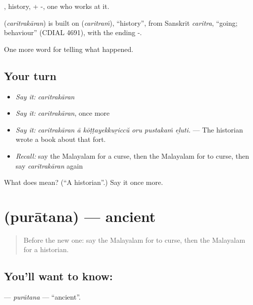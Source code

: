 , history, + -, one who works at it.

\begin{cousinweb}
\textbf{} (\emph{caritrakāran}) is built on  (\emph{caritraṁ}), \textquotedblleft{}history\textquotedblright{}, from Sanskrit \emph{caritra}, \textquotedblleft{}going; behaviour\textquotedblright{} (CDIAL 4691), with the ending -.
\end{cousinweb}

\begin{grammarlens}[title={What you've built}]
One more word for telling what happened.
\end{grammarlens}

\subsection*{Your turn}
\begin{itemize}
\raggedright
  \item \emph{Say it:} \emph{caritrakāran}
  \item \emph{Say it:} \emph{caritrakāran}, once more
  \item \emph{Say it:} \emph{caritrakāran ā kōṭṭayekkuṟiccŭ oru pustakaṁ eḻuti.} — The historian wrote a book about that fort.
  \item \emph{Recall:} say the Malayalam for a curse, then the Malayalam for to curse, then say \emph{caritrakāran} again
\end{itemize}

\begin{tcolorbox}[breakable,colback=teal!4,colframe=teal!35!black,title={Before you move on}]
What does  mean? (\textquotedblleft{}A historian\textquotedblright{}.) Say it once more.
\end{tcolorbox}
\section[\texorpdfstring{\ml{പുരാതന} (purātana)}{പുരാതന (purātana)}]{ (purātana) — ancient}

\label{lesson:ML-C404-puratana}



\begin{quote}
Before the new one: say the Malayalam for to curse, then the Malayalam for a historian.
\end{quote}

\subsection*{You'll want to know: }
\textbf{} — \emph{purātana} — \textquotedblleft{}ancient\textquotedblright{}.


